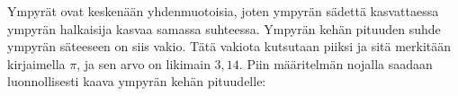 Ympyrät ovat keskenään yhdenmuotoisia, joten ympyrän sädettä kasvattaessa ympyrän halkaisija kasvaa samassa suhteessa. Ympyrän kehän pituuden suhde ympyrän säteeseen on siis vakio. Tätä vakiota kutsutaan piiksi ja sitä merkitään kirjaimella $\pi$, ja sen arvo on likimain $3,14$. Piin määritelmän nojalla saadaan luonnollisesti kaava ympyrän kehän pituudelle:




